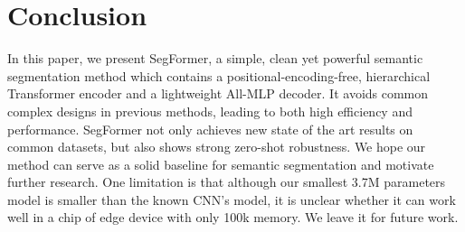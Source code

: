 \begin{savenotes}
\begin{minipage}{1.0\textwidth}

\centering
{}
\label{tab:benchmark_cityscapes}

\resizebox{\textwidth}{!}{
\addtolength{\tabcolsep}{2pt}

}

\end{minipage}
\end{savenotes}

\section{Conclusion}   \label{sec:concl}
In this paper, we present SegFormer, a simple, clean yet powerful semantic segmentation method which contains a positional-encoding-free, hierarchical Transformer encoder and a lightweight All-MLP decoder. It avoids common complex designs in previous methods, leading to both high efficiency and performance. SegFormer not only achieves new state of the art results on common datasets, but also shows strong zero-shot robustness. We hope our method can serve as a solid baseline for semantic segmentation and motivate further research. One limitation is that although our smallest 3.7M parameters model is smaller than the known CNN's model, it is unclear whether it can work well in a chip of edge device with only 100k memory. We leave it for future work.


